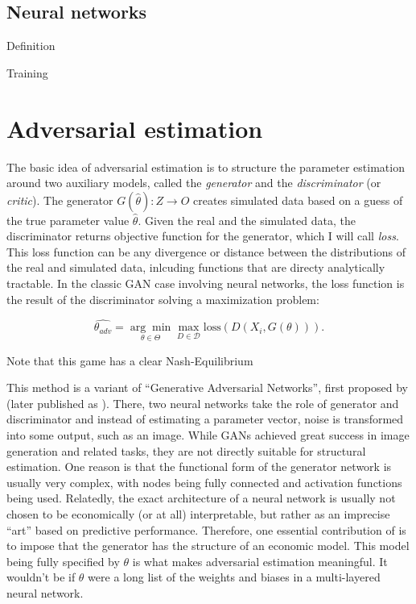 \subsection{Neural networks}
\label{sec:neural_networks}

Definition

Training

\section{Adversarial estimation}
\label{sec:adversarial_estimation}

The basic idea of adversarial estimation is to structure the parameter estimation around two auxiliary models, called the \textit{generator} and the \textit{discriminator} (or \textit{critic}).
The generator $G(\hat{\theta}) : Z \rightarrow O$ creates simulated data based on a guess of the true parameter value $\hat{\theta}$.
Given the real and the simulated data, the discriminator returns objective function for the generator, which I will call \textit{loss}.
This loss function can be any divergence or distance between the distributions of the real and simulated data, inlcuding functions that are directy analytically tractable.
In the classic GAN case involving neural networks, the loss function is the result of the discriminator solving a maximization problem:

\begin{equation}
\label{eq:adversarial_estimator}
    \hat{\theta_{adv}} = \underset{\theta \in \Theta}{\arg \min } \max _{D \in \mathcal{D}} \text{loss}(D(X_i, G(\theta))).
\end{equation}

Note that this game has a clear Nash-Equilibrium

This method is a variant of ``Generative Adversarial Networks'', first proposed by \textcite{goodfellow2014generative} (later published as \textcite{goodfellow2020generative}).
There, two neural networks take the role of generator and discriminator and instead of estimating a parameter vector, noise is transformed into some output, such as an image.
While GANs achieved great success in image generation and related tasks, %
they are not directly suitable for structural estimation.
One reason is that the functional form of the generator network is usually very complex, with nodes being fully connected and activation functions being used.
Relatedly, the exact architecture of a neural network is usually not chosen to be economically (or at all) interpretable, but rather as an imprecise ``art'' based on predictive performance.
Therefore, one essential contribution of \textcite{kaji2023adversarial} is to impose that the generator has the structure of an economic model.
This model being fully specified by $\theta$ is what makes adversarial estimation meaningful.
It wouldn't be if $\theta$ were a long list of the weights and biases in a multi-layered neural network.

